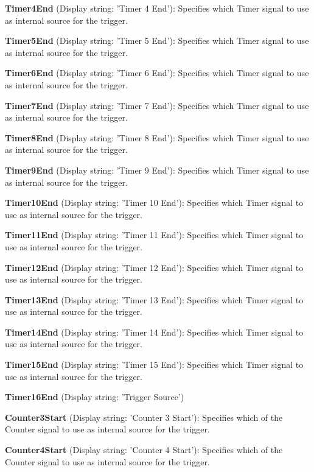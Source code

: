 \begin{DoxyItemize}
\item {\bfseries Timer4\+End} (Display string\+: 'Timer 4 End')\+: Specifies which Timer signal to use as internal source for the trigger.
\item {\bfseries Timer5\+End} (Display string\+: 'Timer 5 End')\+: Specifies which Timer signal to use as internal source for the trigger.
\item {\bfseries Timer6\+End} (Display string\+: 'Timer 6 End')\+: Specifies which Timer signal to use as internal source for the trigger.
\item {\bfseries Timer7\+End} (Display string\+: 'Timer 7 End')\+: Specifies which Timer signal to use as internal source for the trigger.
\item {\bfseries Timer8\+End} (Display string\+: 'Timer 8 End')\+: Specifies which Timer signal to use as internal source for the trigger.
\item {\bfseries Timer9\+End} (Display string\+: 'Timer 9 End')\+: Specifies which Timer signal to use as internal source for the trigger.
\item {\bfseries Timer10\+End} (Display string\+: 'Timer 10 End')\+: Specifies which Timer signal to use as internal source for the trigger.
\item {\bfseries Timer11\+End} (Display string\+: 'Timer 11 End')\+: Specifies which Timer signal to use as internal source for the trigger.
\item {\bfseries Timer12\+End} (Display string\+: 'Timer 12 End')\+: Specifies which Timer signal to use as internal source for the trigger.
\item {\bfseries Timer13\+End} (Display string\+: 'Timer 13 End')\+: Specifies which Timer signal to use as internal source for the trigger.
\item {\bfseries Timer14\+End} (Display string\+: 'Timer 14 End')\+: Specifies which Timer signal to use as internal source for the trigger.
\item {\bfseries Timer15\+End} (Display string\+: 'Timer 15 End')\+: Specifies which Timer signal to use as internal source for the trigger.
\item {\bfseries Timer16\+End} (Display string\+: 'Trigger Source')
\item {\bfseries Counter3\+Start} (Display string\+: 'Counter 3 Start')\+: Specifies which of the Counter signal to use as internal source for the trigger.
\item {\bfseries Counter4\+Start} (Display string\+: 'Counter 4 Start')\+: Specifies which of the Counter signal to use as internal source for the trigger.

\end{DoxyItemize}
